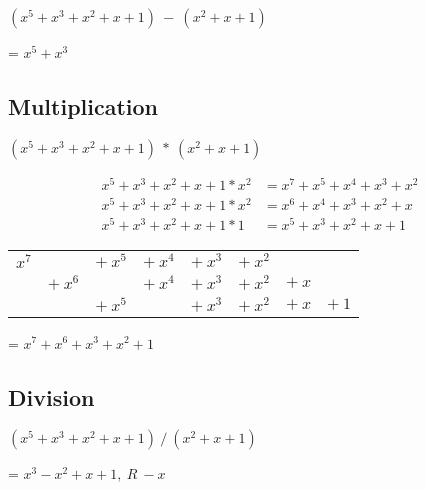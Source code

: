 \documentclass[letterpaper]{article}
\begin{document}
\((x^5 + x^3 + x^2 + x + 1)\ -\ (x^2 + x + 1)\)

= \(x^5 + x^3\)

\subsection{Multiplication}

\((x^5 + x^3 + x^2 + x + 1)\ *\ (x^2 + x + 1)\)

\begin{equation*}
  \begin{split}
    x^5 + x^3 + x^2 + x + 1 * x^2 &= x^7 + x^5 + x^4 + x^3 + x^2 \\
    x^5 + x^3 + x^2 + x + 1 * x^2 &= x^6 + x^4 + x^3 + x^2 + x \\
    x^5 + x^3 + x^2 + x + 1 * 1 &= x^5 + x^3 + x^2 + x + 1
  \end{split}
\end{equation*}

\begin{tabular}{ c c c c c c c c }
\(x^7\) &   & \(+\ x^5\) & \(+\ x^4\) & \(+\ x^3\) &\(+\ x^2\)&   &   \\
  & \(+\ x^6\) &   & \(+\ x^4\) & \(+\ x^3\) & \(+\ x^2\) &\(+\ x\) &   \\
  &   & \(+\ x^5\) &   & \(+\ x^3\) & \(+\ x^2\) & \(+\ x\) & \(+\ 1\) \\
\end{tabular}

= \(x^7 + x^6 + x^3 + x^2 + 1\)

\subsection{Division}

\((x^5 + x^3 + x^2 + x + 1)\ /\ (x^2 + x + 1)\)


= \(x^3 - x^2 + x + 1,\ R\ -x\)
\end{document}
